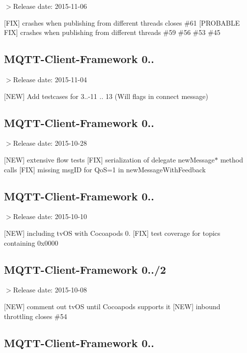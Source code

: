 $>$Release date\+: 2015-\/11-\/06

\mbox{[}F\+IX\mbox{]} crashes when publishing from different threads closes \#61 \mbox{[}P\+R\+O\+B\+A\+B\+LE F\+IX\mbox{]} crashes when publishing from different threads \#59 \#56 \#53 \#45

\subsection*{M\+Q\+T\+T-\/\+Client-\/\+Framework 0..}

$>$Release date\+: 2015-\/11-\/04

\mbox{[}N\+EW\mbox{]} Add testcases for 3..-\/11 .. 13 (Will flags in connect message)

\subsection*{M\+Q\+T\+T-\/\+Client-\/\+Framework 0..}

$>$Release date\+: 2015-\/10-\/28

\mbox{[}N\+EW\mbox{]} extensive flow tests \mbox{[}F\+IX\mbox{]} serialization of delegate new\+Message$\ast$ method calls \mbox{[}F\+IX\mbox{]} missing msg\+ID for QoS=1 in new\+Message\+With\+Feedback

\subsection*{M\+Q\+T\+T-\/\+Client-\/\+Framework 0..}

$>$Release date\+: 2015-\/10-\/10

\mbox{[}N\+EW\mbox{]} including tv\+OS with Cocoapods 0. \mbox{[}F\+IX\mbox{]} test coverage for topics containing 0x0000

\subsection*{M\+Q\+T\+T-\/\+Client-\/\+Framework 0../2}

$>$Release date\+: 2015-\/10-\/08

\mbox{[}N\+EW\mbox{]} comment out tv\+OS until Cocoapods supports it \mbox{[}N\+EW\mbox{]} inbound throttling closes \#54

\subsection*{M\+Q\+T\+T-\/\+Client-\/\+Framework 0..}

